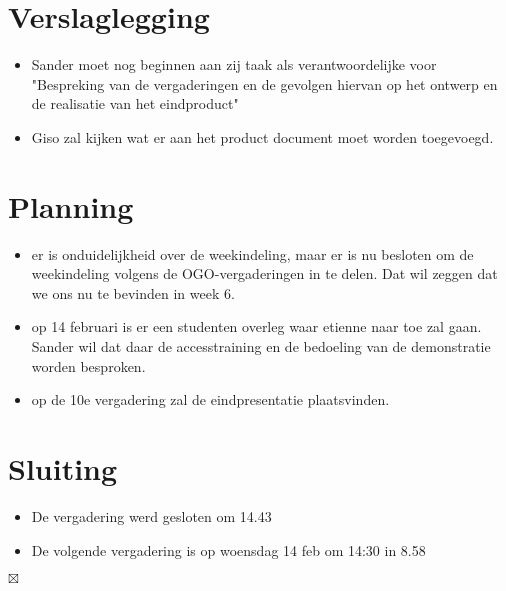 \documentclass[]{article}
\begin{document}
\section{Verslaglegging}

\begin{itemize}
   \item Sander moet nog beginnen aan zij taak als
   verantwoordelijke voor "Bespreking van de vergaderingen en de gevolgen hiervan op het ontwerp en de realisatie van het
   eindproduct"
   \item Giso zal kijken wat er aan het product document moet worden
   toegevoegd.
\end{itemize}

\section{Planning}

\begin{itemize}
   \item er is onduidelijkheid over de weekindeling, maar er is nu
   besloten om de weekindeling volgens de OGO-vergaderingen in te
   delen. Dat wil zeggen dat we ons nu te bevinden in week 6.
   \item op 14 februari is er een studenten overleg waar etienne
   naar toe zal gaan. Sander wil dat daar de accesstraining en de
   bedoeling van de demonstratie worden besproken.
   \item op de 10e vergadering zal de eindpresentatie plaatsvinden.
\end{itemize}

\section{Sluiting}
  \begin{itemize}
    \item De vergadering werd gesloten om 14.43
    \item De volgende vergadering is op woensdag 14 feb om 14:30 in
    8.58
  \end{itemize}

$\boxtimes$
\end{document}

